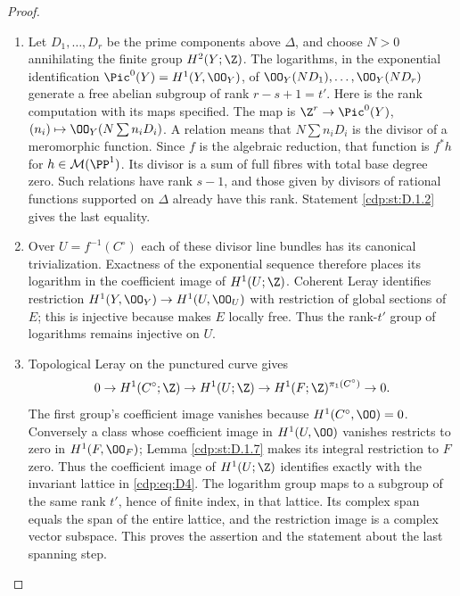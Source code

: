 \begin{proof}

\begin{enumerate}[label={$\langle1\rangle$\arabic*.},leftmargin=*]
\item Let $D_1,\ldots,D_r$ be the prime components above $\Delta$, and
choose $N>0$ annihilating the finite group $H^2(Y;\Z)$.
The logarithms, in the exponential identification
$\Pic^0(Y)=H^1(Y,\OO_Y)$, of
$\OO_Y(ND_1),\ldots,\OO_Y(ND_r)$ generate a free abelian
subgroup of rank $r-s+1=t'$.
Here is the rank computation with its maps specified. The map is
$\Z^r\to\Pic^0(Y)$, $(n_i)\mapsto\OO_Y(N\sum n_iD_i)$.
A relation means that $N\sum n_iD_i$ is the divisor of a
meromorphic function. Since $f$ is the algebraic reduction, that
function is $f^*h$ for $h\in\mathcal M(\PP^1)$.
Its divisor is a sum of full fibres with total base degree zero.
Such relations have rank $s-1$, and those given by divisors of
rational functions supported on $\Delta$ already have this rank.
Statement \ref{cdp:st:D.1.2} gives the last equality.

\item Over $U=f^{-1}(C^\circ)$ each of these divisor line bundles has
its canonical trivialization. Exactness of the exponential sequence
therefore places its logarithm in the coefficient image of
$H^1(U;\Z)$. Coherent Leray identifies restriction
$H^1(Y,\OO_Y)\to H^1(U,\OO_U)$ with restriction of global
sections of $E$; this is injective because \cite[Theorem~2.2, pp.~4--5]{Viaclovsky2026Combs} makes $E$ locally free.
Thus the rank-$t'$ group of logarithms remains injective on $U$.

\item Topological Leray on the punctured curve gives
\[
0\to H^1(C^\circ;\Z)\to H^1(U;\Z)
\to H^1(F;\Z)^{\pi_1(C^\circ)}\to0.
\]
The first group's coefficient image vanishes because
$H^1(C^\circ,\OO)=0$. Conversely a class whose coefficient image
in $H^1(U,\OO)$ vanishes restricts to zero in $H^1(F,\OO_F)$;
Lemma \ref{cdp:st:D.1.7} makes its integral restriction to $F$ zero. Thus the
coefficient image of $H^1(U;\Z)$ identifies exactly with the
invariant lattice in \eqref{cdp:eq:D4}. The logarithm group maps to a subgroup
of the same rank $t'$, hence of finite index, in that lattice.
Its complex span equals the span of the entire lattice, and the
restriction image is a complex vector subspace. This proves the
assertion and the statement about the last spanning step.

\end{enumerate}
\end{proof}